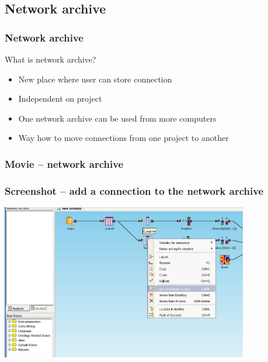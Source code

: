 \documentclass{beamer}
\begin{document}
\subsection{Network archive}
\begin{frame}
	\frametitle{Network archive}
	\begin{block}{What is network archive?}
		\begin{itemize}[<+->]
			\item New place where user can store connection
			\item Independent on project
			\item One network archive can be used from more computers
			\item Way how to move connections from one project to another
		\end{itemize}
	\end{block}
\end{frame}

\begin{frame}
	\frametitle{Movie -- network archive}
\end{frame}

\begin{frame}
	\frametitle{Screenshot -- add a connection to the network archive}
	\includegraphics[width=10.8cm]{add_to_network_archive}
\end{frame}
\end{document}
